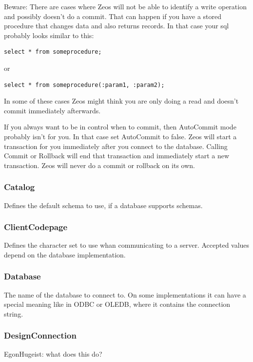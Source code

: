 \documentclass[a4paper,12pt,oneside]{book}
\begin{document}
Beware:
There are cases where Zeos will not be able to identify a write operation and possibly doesn't do a commit.
That can happen if you have a stored procedure that changes data and also returns records.
In that case your sql probably looks similar to this:

\begin{lstlisting}
select * from someprocedure;
\end{lstlisting}

or 

\begin{lstlisting}
select * from someprocedure(:param1, :param2);
\end{lstlisting}

In some of these cases Zeos might think you are only doing a read and doesn't commit immediately afterwards.

If you always want to be in control when to commit, then AutoCommit mode probably isn't for you.
In that case set AutoCommit to false.
Zeos will start a transaction for you immediately after you connect to the database.
Calling Commit or Rollback will end that transaction and immediately start a new transaction.
Zeos will never do a commit or rollback on its own.

\FloatBarrier
\subsubsection{Catalog}
Defines the default schema to use, if a database supports schemas.

\subsubsection{ClientCodepage}
Defines the character set to use whan communicating to a server.
Accepted values depend on the database implementation.

\subsubsection{Database}
The name of the database to connect to.
On some implementations it can have a special meaning like in ODBC or OLEDB, where it contains the connection string.

\subsubsection{DesignConnection}
EgonHugeist: what does this do?
\end{document}
